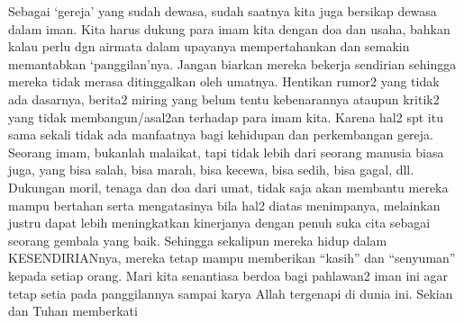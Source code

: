Sebagai ‘gereja’ yang sudah dewasa, sudah saatnya kita juga bersikap dewasa dalam iman. Kita harus dukung para imam kita dengan doa dan usaha, bahkan kalau perlu dgn airmata dalam upayanya mempertahankan dan semakin memantabkan ‘panggilan’nya. Jangan biarkan mereka bekerja sendirian sehingga mereka tidak merasa ditinggalkan oleh umatnya. Hentikan rumor2 yang tidak ada dasarnya, berita2 miring yang belum tentu kebenarannya ataupun kritik2 yang tidak membangun/asal2an terhadap para imam kita. Karena hal2 spt itu sama sekali tidak ada manfaatnya bagi kehidupan dan perkembangan gereja.
Seorang imam, bukanlah malaikat, tapi tidak lebih dari seorang manusia biasa juga, yang bisa salah, bisa marah, bisa kecewa, bisa sedih, bisa gagal, dll. Dukungan moril, tenaga dan doa dari umat, tidak saja akan membantu mereka mampu bertahan serta mengatasinya bila hal2 diatas menimpanya, melainkan justru dapat lebih meningkatkan kinerjanya dengan penuh suka cita sebagai seorang gembala yang baik. Sehingga sekalipun mereka hidup dalam KESENDIRIANnya, mereka tetap mampu memberikan “kasih” dan “senyuman” kepada setiap orang.
Mari kita senantiasa berdoa bagi pahlawan2 iman ini agar tetap setia pada panggilannya sampai karya Allah tergenapi di dunia ini.
Sekian dan Tuhan memberkati

